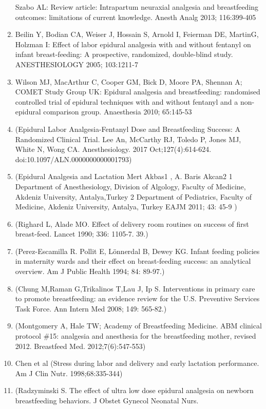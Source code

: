 \documentclass[]{article}
\begin{document}
\begin{enumerate}
  Szabo AL: Review article: Intrapartum neuraxial analgesia and
  breastfeeding outcomes: limitations of current knowledge. Anesth Analg
  2013; 116:399-405
\item
  Beilin Y, Bodian CA, Weiser J, Hossain S, Arnold I, Feierman DE,
  MartinG, Holzman I: Effect of labor epidural analgesia with and
  without fentanyl on infant breast-feeding: A prospective, randomized,
  double-blind study. ANESTHESIOLOGY 2005; 103:1211-7
\item
  Wilson MJ, MacArthur C, Cooper GM, Bick D, Moore PA, Shennan A; COMET
  Study Group UK: Epidural analgesia and breastfeeding: randomised
  controlled trial of epidural techniques with and without fentanyl and
  a non-epidural comparison group. Anaesthesia 2010; 65:145-53
\item
  (Epidural Labor Analgesia-Fentanyl Dose and Breastfeeding Success: A
  Randomized Clinical Trial. Lee An, McCarthy RJ, Toledo P, Jones MJ,
  White N, Wong CA. Anesthesiology. 2017 Oct;127(4):614-624.
  doi:10.1097/ALN.0000000000001793)
\item
  (Epidural Analgesia and Lactation Mert Akbas1 , A. Baris Akcan2 1
  Department of Anesthesiology, Division of Algology, Faculty of
  Medicine, Akdeniz University, Antalya,Turkey 2 Department of
  Pediatrics, Faculty of Medicine, Akdeniz University, Antalya, Turkey
  EAJM 2011; 43: 45-9 )
\item
  (Righard L, Alade MO. Effect of delivery room routines on success of
  first breast-feed. Lancet 1990; 336: 1105-7. 39.)
\item
  (Perez-Escamilla R. Pollit E, Lönnerdal B, Dewey KG. Infant feeding
  policies in maternity wards and their effect on breast-feeding
  success: an analytical overview. Am J Public Health 1994; 84: 89-97.)
\item
  (Chung M,Raman G,Trikalinos T,Lau J, Ip S. Interventions in primary
  care to promote breastfeeding: an evidence review for the U.S.
  Preventive Services Task Force. Ann Intern Med 2008; 149: 565-82.)
\item
  (Montgomery A, Hale TW; Academy of Breastfeeding Medicine. ABM
  clinical protocol \#15: analgesia and anesthesia for the breastfeeding
  mother, revised 2012. Breastfeed Med. 2012;7(6):547-553)
\item
  Chen et al (Stress during labor and delivery and early lactation
  performance. Am J Clin Nutr. 1998;68:335-344)
\item
  (Radzyminski S. The effect of ultra low dose epidural analgesia on
  newborn breastfeeding behaviors. J Obstet Gynecol Neonatal Nurs.

\end{enumerate}
\end{document}
